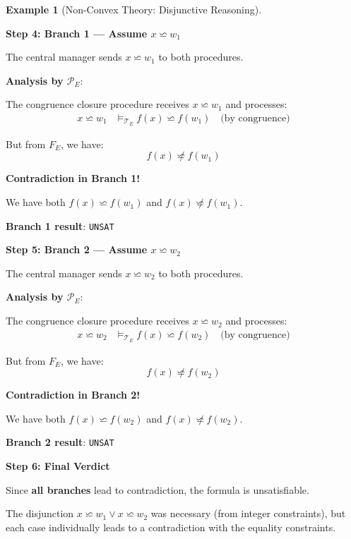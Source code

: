 \documentclass[11pt,a4paper]{article}
\theoremstyle{definition}
\newtheorem{example}{Example}[section]
\theoremstyle{plain}
\theoremstyle{remark}
\begin{document}
\begin{example}[Non-Convex Theory: Disjunctive Reasoning]
\begin{tcolorbox}[colback=purple!5!white,colframe=purple!75!black,title=\textbf{Example 3: Non-Convex $\mathcal{T}_{\text{LIA}}$ with Disjunctions},breakable]
\vspace{0.5em}

\textbf{Step 4: Branch 1 — Assume $x \backsimeq w_1$}

The central manager sends $x \backsimeq w_1$ to both procedures.

\textbf{Analysis by $\mathcal{P}_E$}:

The congruence closure procedure receives $x \backsimeq w_1$ and processes:
\begin{align*}
x \backsimeq w_1 &\models_{\mathcal{T}_E} f(x) \backsimeq f(w_1) \quad \text{(by congruence)}
\end{align*}

But from $F_E$, we have:
\[
f(x) \not\backsimeq f(w_1)
\]

\textbf{Contradiction in Branch 1!}

We have both $f(x) \backsimeq f(w_1)$ and $f(x) \not\backsimeq f(w_1)$.

\textbf{Branch 1 result}: \texttt{UNSAT}

\vspace{0.5em}

\textbf{Step 5: Branch 2 — Assume $x \backsimeq w_2$}

The central manager sends $x \backsimeq w_2$ to both procedures.

\textbf{Analysis by $\mathcal{P}_E$}:

The congruence closure procedure receives $x \backsimeq w_2$ and processes:
\begin{align*}
x \backsimeq w_2 &\models_{\mathcal{T}_E} f(x) \backsimeq f(w_2) \quad \text{(by congruence)}
\end{align*}

But from $F_E$, we have:
\[
f(x) \not\backsimeq f(w_2)
\]

\textbf{Contradiction in Branch 2!}

We have both $f(x) \backsimeq f(w_2)$ and $f(x) \not\backsimeq f(w_2)$.

\textbf{Branch 2 result}: \texttt{UNSAT}

\vspace{0.5em}

\textbf{Step 6: Final Verdict}

Since \textbf{all branches} lead to contradiction, the formula is unsatisfiable.

The disjunction $x \backsimeq w_1 \vee x \backsimeq w_2$ was necessary (from integer constraints), but each case individually leads to a contradiction with the equality constraints.


\end{tcolorbox}
\end{example}
\end{document}
